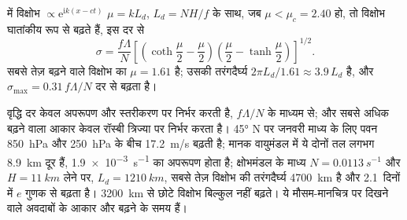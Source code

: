 \begin{theorem}[ईडी वृद्धि दर]\label{thm:b3:atmospheric-dynamics:eady}
 में विक्षोभ $\propto \mathrm e^{\mathrm ik(x - ct)}$
$\mu = kL_d$, $L_d = NH/f$ के साथ, जब $\mu < \mu_c =
2.40$ हो, तो विक्षोभ घातांकीय रूप से बढ़ते हैं, इस दर से
\[
\sigma = \frac{f\Lambda}{N}\left[\left(\coth\frac{\mu}{2} - \frac{\mu}{2}\right)\left(\frac{\mu}{2} - \tanh\frac{\mu}{2}\right)\right]^{1/2} .
\]
सबसे तेज़ बढ़ने वाले विक्षोभ का $\mu = 1.61$ है; उसकी तरंगदैर्घ्य $2\pi L_d/1.61
\approx 3.9\,L_d$ है, और $\sigma_{\max} = 0.31\,f\Lambda/N$ दर से बढ़ता है।
\end{theorem}
\admitted

वृद्धि दर केवल अपरूपण और स्तरीकरण पर निर्भर करती है,
$f\Lambda/N$ के माध्यम से; और सबसे अधिक बढ़ने वाला आकार केवल रॉस्बी त्रिज्या पर निर्भर करता है।
\ang{45} N पर जनवरी माध्य के लिए पवन \qty{850}{hPa} और \qty{250}{hPa} के बीच
\qty{17.2}{m/s} बढ़ती है; मानक वायुमंडल में ये दोनों तल लगभग \qty{8.9}{km} दूर हैं,
\qty{1.9e-3}{s^{-1}} का अपरूपण होता है; क्षोभमंडल के माध्य
 $N = \qty{0.0113}{s^{-1}}$ और $H = \qty{11}{km}$ लेने पर, $L_d =
\qty{1210}{km}$, सबसे तेज़ विक्षोभ की तरंगदैर्घ्य \qty{4700}{km} है
और \num{2.1}~दिनों में $e$ गुणक से बढ़ता है। \qty{3200}{km} से छोटे विक्षोभ
बिल्कुल नहीं बढ़ते। ये मौसम-मानचित्र पर दिखने वाले अवदाबों के
आकार और बढ़ने के समय हैं।


